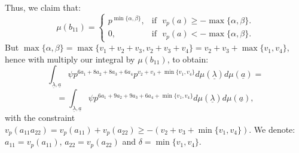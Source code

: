 \documentclass{article}
\begin{document}
Thus, we claim that:
\[\mu(b_{11})=
\begin{cases}
p^{\min\{\alpha,\beta\}},&\text{if}\,\,\,\,v_p(a)\geq-\max\{\alpha,\beta\}. \\
0,&\text{if}\,\,\,\,v_p(a)<-\max\{\alpha,\beta\}.
\end{cases}
\]
But $\max\{\alpha,\beta\}=\max\{v_1+v_2+v_3,v_2+v_3+v_4\}=v_2+v_3+\max\{v_1,v_4\}$, hence with multiply our integral by $\mu(b_{11})$, to obtain:
\[
\int_{\underline\lambda,\underline{a}}\psi{p}^{6a_1+8a_2+8a_3+6a_4}p^{v_2+v_3+\min\{v_1,v_4\}}d\mu(\underline\lambda)d\mu(\underline{a})=\]\[=\int_{\underline\lambda,\underline{a}}\psi{p}^{6a_1+9a_2+9a_3+6a_4+\min\{v_1,v_4\}}d\mu(\underline\lambda)d\mu(\underline{a}),
\]
with the constraint $v_p(a_{11}a_{22})=v_p(a_{11})+v_p(a_{22})\geq-(v_2+v_3+\min\{v_1,v_4\})$.
We denote: $a_{11}=v_p(a_{11})$, $a_{22}=v_p(a_{22})$ and $\delta=\min\{v_1,v_4\}$.
\end{document}
